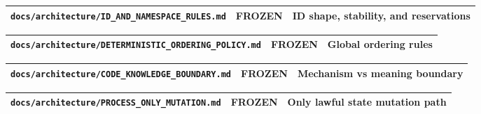 \documentclass[9pt,a4paper,openany]{book}
\newcommand{\toprule}{\hline}
\newcommand{\midrule}{\hline}
\newcommand{\bottomrule}{\hline}
\begin{document}
\begin{center}
{\small\renewcommand{\arraystretch}{1.18}
\begin{tabularx}{\linewidth}{@{}>{\raggedright\arraybackslash}X >{\raggedright\arraybackslash}X >{\raggedright\arraybackslash}X@{}}
\toprule
\textbf{\texttt{docs/\allowbreak{}architecture/\allowbreak{}ID\_\allowbreak{}AND\_\allowbreak{}NAMESPACE\_\allowbreak{}RULES.\allowbreak{}md}} & \textbf{FROZEN} & \textbf{ID shape, stability, and reservations} \\
\midrule
\bottomrule
\end{tabularx}
}
\end{center}


\begin{center}
{\small\renewcommand{\arraystretch}{1.18}
\begin{tabularx}{\linewidth}{@{}>{\raggedright\arraybackslash}X >{\raggedright\arraybackslash}X >{\raggedright\arraybackslash}X@{}}
\toprule
\textbf{\texttt{docs/\allowbreak{}architecture/\allowbreak{}DETERMINISTIC\_\allowbreak{}ORDERING\_\allowbreak{}POLICY.\allowbreak{}md}} & \textbf{FROZEN} & \textbf{Global ordering rules} \\
\midrule
\bottomrule
\end{tabularx}
}
\end{center}


\begin{center}
{\small\renewcommand{\arraystretch}{1.18}
\begin{tabularx}{\linewidth}{@{}>{\raggedright\arraybackslash}X >{\raggedright\arraybackslash}X >{\raggedright\arraybackslash}X@{}}
\toprule
\textbf{\texttt{docs/\allowbreak{}architecture/\allowbreak{}CODE\_\allowbreak{}KNOWLEDGE\_\allowbreak{}BOUNDARY.\allowbreak{}md}} & \textbf{FROZEN} & \textbf{Mechanism vs meaning boundary} \\
\midrule
\bottomrule
\end{tabularx}
}
\end{center}


\begin{center}
{\small\renewcommand{\arraystretch}{1.18}
\begin{tabularx}{\linewidth}{@{}>{\raggedright\arraybackslash}X >{\raggedright\arraybackslash}X >{\raggedright\arraybackslash}X@{}}
\toprule
\textbf{\texttt{docs/\allowbreak{}architecture/\allowbreak{}PROCESS\_\allowbreak{}ONLY\_\allowbreak{}MUTATION.\allowbreak{}md}} & \textbf{FROZEN} & \textbf{Only lawful state mutation path} \\
\midrule
\bottomrule
\end{tabularx}
}
\end{center}
\end{document}
